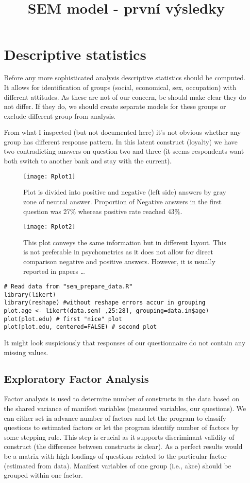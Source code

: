 \documentclass[10pt,a4paper]{article}
\title{SEM model - první výsledky}
\begin{document}
\section{Descriptive statistics}
Before any more sophisticated analysis descriptive statistics should be computed. It allows for identification of groups (social, economical, sex, occupation) with different attitudes. As these are not of our concern, be should make clear they do not differ. If they do, we should create separate models for these groups or exclude different group from analysis.

From what I inspected (but not documented here) it's not obvious whether any group has different response pattern. In this latent construct (loyalty) we have two contradicting answers on question two and three (it seems respondents want both switch to another bank and stay with the current).

\begin{figure}[htbp]
\texttt{[image: Rplot1]}
\caption{Plot is divided into positive and negative (left side) answers by gray zone of neutral answer. Proportion of Negative answers in the first question was 27\% whereas positive rate reached 43\%.}
\end{figure}

\begin{figure}
\texttt{[image: Rplot2]}
\caption{This plot conveys the same information but in different layout. This is not preferable in psychometrics as it does not allow for direct comparison negative and positive answers. However, it is usually reported in papers \dots }
\end{figure}
\begin{lstlisting}
# Read data from "sem_prepare_data.R"
library(likert)
library(reshape) #without reshape errors accur in grouping
plot.age <- likert(data.sem[ ,25:28], grouping=data.in$age)
plot(plot.edu) # first "nice" plot
plot(plot.edu, centered=FALSE) # second plot
\end{lstlisting}

It might look suspiciously that responses of our questionnaire do not contain any missing values.

\subsection{Exploratory Factor Analysis}
Factor analysis is used to determine number of constructs in the data based on the shared variance of manifest variables (measured variables, our questions). We can either set in advance number of factors and let the program to classify questions to estimated factors or let the program identify number of factors by some stepping rule. This step is crucial as it supports discriminant validity of construct (the difference between constructs is clear). As a perfect results would be a matrix with high loadings of questions related to the particular factor (estimated from data). Manifest variables of one group (i.e., akce) should be grouped within one factor.
\end{document}

